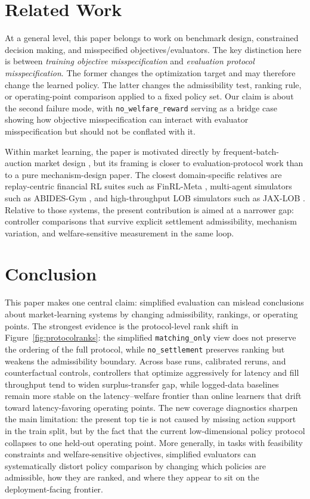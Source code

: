\documentclass[11pt]{article}
\begin{document}
\section{Related Work}
At a general level, this paper belongs to work on benchmark design, constrained decision making, and misspecified objectives/evaluators. The key distinction here is between \emph{training objective misspecification} and \emph{evaluation protocol misspecification}. The former changes the optimization target and may therefore change the learned policy. The latter changes the admissibility test, ranking rule, or operating-point comparison applied to a fixed policy set. Our claim is about the second failure mode, with \texttt{no\_welfare\_reward} serving as a bridge case showing how objective misspecification can interact with evaluator misspecification but should not be conflated with it.

Within market learning, the paper is motivated directly by frequent-batch-auction market design \cite{budish2015fba}, but its framing is closer to evaluation-protocol work than to a pure mechanism-design paper. The closest domain-specific relatives are replay-centric financial RL suites such as FinRL-Meta \cite{liu2022finrlmeta}, multi-agent simulators such as ABIDES-Gym \cite{amrouni2021abidesgym}, and high-throughput LOB simulators such as JAX-LOB \cite{frey2023jaxlob}. Relative to those systems, the present contribution is aimed at a narrower gap: controller comparisons that survive explicit settlement admissibility, mechanism variation, and welfare-sensitive measurement in the same loop.

\section{Conclusion}
This paper makes one central claim: simplified evaluation can mislead conclusions about market-learning systems by changing admissibility, rankings, or operating points. The strongest evidence is the protocol-level rank shift in Figure~\ref{fig:protocolranks}: the simplified \texttt{matching\_only} view does not preserve the ordering of the full protocol, while \texttt{no\_settlement} preserves ranking but weakens the admissibility boundary. Across base runs, calibrated reruns, and counterfactual controls, controllers that optimize aggressively for latency and fill throughput tend to widen surplus-transfer gap, while logged-data baselines remain more stable on the latency--welfare frontier than online learners that drift toward latency-favoring operating points. The new coverage diagnostics sharpen the main limitation: the present top tie is not caused by missing action support in the train split, but by the fact that the current low-dimensional policy protocol collapses to one held-out operating point. More generally, in tasks with feasibility constraints and welfare-sensitive objectives, simplified evaluators can systematically distort policy comparison by changing which policies are admissible, how they are ranked, and where they appear to sit on the deployment-facing frontier.
\appendix
\end{document}
